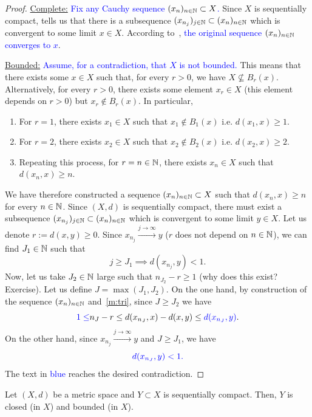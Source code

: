 \begin{proof}
\ul{Complete:} \textcolor{blue}{Fix any Cauchy sequence $(x_n)_{n\in\mathbb{N}}\subset X$.} Since $X$ is sequentially compact,  tells us that there is a subsequence $(x_{n_j})_{j\in\mathbb{N}}\subset (x_n)_{n\in\mathbb{N}}$ which is convergent to some limit $x\in X$. According to~, \textcolor{blue}{the original sequence $(x_n)_{n\in\mathbb{N}}$ converges to $x$}.

\ul{Bounded:} \textcolor{blue}{Assume, for a contradiction, that $X$ is not bounded.} This means that there exists some $x\in X$ such that, for every $r>0$, we have $X \nsubseteq B_r(x)$. Alternatively, for every $r>0$, there exists some element $x_r \in X$ (this element depends on $r>0$) but $x_r \notin B_r(x)$. In particular,
\begin{enumerate}
	\item For $r=1$, there exists $x_1 \in X$ such that $x_1 \notin B_1(x)$ i.e. $d(x_1,x)\ge 1$.
	\item For $r=2$, there exists $x_2 \in X$ such that $x_2 \notin B_2(x)$ i.e. $d(x_2,x) \ge 2$.
	\item Repeating this process, for $r = n\in\mathbb{N}$, there exists $x_n\in X$ such that $d(x_n,x)\ge n$.
\end{enumerate}
We have therefore constructed a sequence $(x_n)_{n\in \mathbb{N}}\subset X$ such that $d(x_n,x)\ge n$ for every $n\in\mathbb{N}$. Since $(X,d)$ is sequentially compact, there must exist a subsequence $(x_{n_j})_{j\in\mathbb{N}}\subset (x_n)_{n\in\mathbb{N}}$ which is convergent to some limit $y\in X$. Let us denote $r:= d(x,y)\ge 0$. Since $x_{n_j}\overset{j\to \infty}{\to} y$ ($r$ does not depend on $n\in\mathbb{N}$), we can find $J_1\in \mathbb{N}$ such that
\[
j\ge J_1 \implies d(x_{n_j},y)<1.
\]
Now, let us take $J_2\in\mathbb{N}$ large such that $n_{J_2} - r \ge 1$ (why does this exist? Exercise). Let us define $J = \max (J_1,J_2)$. On the one hand, by construction of the sequence $(x_n)_{n\in\mathbb{N}}$ and~\ref{m:tri}, since $J\ge J_2$ we have
\[
\textcolor{blue}{1\le} n_{J} - r \le d(x_{n_J},x) - d(x,y) \le  \textcolor{blue}{d(x_{n_J},y)}.
\]
On the other hand, since $x_{n_j}\overset{j\to \infty}{\to}y$ and $J \ge J_1$, we have
\[
\textcolor{blue}{d(x_{n_J},y)<1.}
\]
The text in \textcolor{blue}{blue} reaches the desired contradiction.
\end{proof}
\begin{cor}
\label{cor:seq_cpct_clos_bdd}
Let $(X,d)$ be a metric space and $Y\subset X$ is sequentially compact. Then, $Y$ is closed (in $X$) and bounded (in $X$).
\end{cor}
